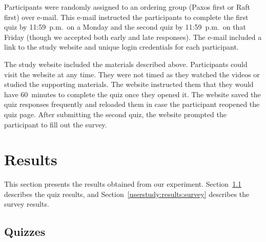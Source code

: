 Participants were randomly assigned to an ordering group (Paxos first or
Raft first) over e-mail. This e-mail instructed the participants to
complete the first quiz by 11:59~p.m.\ on a Monday and the second quiz by
11:59~p.m.\ on that Friday (though we accepted both early and late
responses). The e-mail included a link to the study website and unique
login credentials for each participant.

The study website included the materials described above. Participants
could visit the website at any time. They were
not timed as they watched the videos or studied the supporting materials.
The website instructed them that they would have \SI{60}{minutes} to
complete the quiz once they opened it. The website saved the quiz
responses frequently and reloaded them in case the participant reopened
the quiz page. After submitting the second quiz, the website prompted
the participant to fill out the survey.

\section{Results}

This section presents the results obtained from our experiment.
Section~\ref{userstudy:results:quizzes} describes the quiz results, and
Section~\ref{userstudy:results:survey} describes the survey results.


%

\subsection{Quizzes}
\label{userstudy:results:quizzes}

